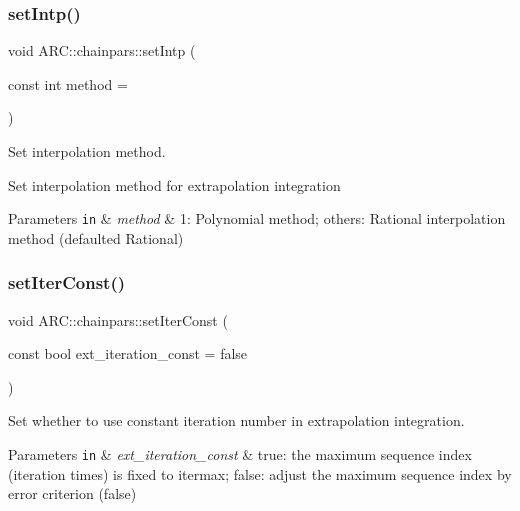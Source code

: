 \subsubsection{\texorpdfstring{set\+Intp()}{setIntp()}}
{\footnotesize\ttfamily void A\+R\+C\+::chainpars\+::set\+Intp (\begin{DoxyParamCaption}\item[{const int}]{method = {} }\end{DoxyParamCaption})\hspace{0.3cm}{\ttfamily [inline]}}



Set interpolation method. 

Set interpolation method for extrapolation integration 
\begin{DoxyParams}[1]{Parameters}
\mbox{\tt in}  & {\em method} & 1\+: Polynomial method; others\+: Rational interpolation method (defaulted Rational) \\
\hline
\end{DoxyParams}
\hypertarget{classARC_1_1chainpars_acee4adb70778441325e76eedbdbe6343}{}\label{classARC_1_1chainpars_acee4adb70778441325e76eedbdbe6343} 
\subsubsection{\texorpdfstring{set\+Iter\+Const()}{setIterConst()}}
{\footnotesize\ttfamily void A\+R\+C\+::chainpars\+::set\+Iter\+Const (\begin{DoxyParamCaption}\item[{const bool}]{ext\+\_\+iteration\+\_\+const = {\ttfamily false} }\end{DoxyParamCaption})\hspace{0.3cm}{\ttfamily [inline]}}



Set whether to use constant iteration number in extrapolation integration. 


\begin{DoxyParams}[1]{Parameters}
\mbox{\tt in}  & {\em ext\+\_\+iteration\+\_\+const} & true\+: the maximum sequence index (iteration times) is fixed to itermax; false\+: adjust the maximum sequence index by error criterion (false) \\
\hline
\end{DoxyParams}
\hypertarget{classARC_1_1chainpars_a4b9a1b853f414f1dfb4ca1fc36d2178b}{}\label{classARC_1_1chainpars_a4b9a1b853f414f1dfb4ca1fc36d2178b} 
